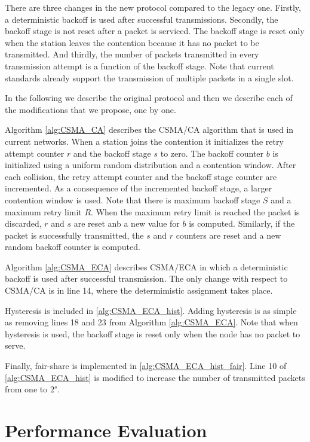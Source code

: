 \documentclass[conference]{IEEEtran}
\begin{document}
There are three changes in the new protocol compared to the legacy one.
Firstly, a deterministic backoff is used after successful transmissions.
Secondly, the backoff stage is not reset after a packet is serviced.
The backoff stage is reset only when the station leaves the contention because it has no packet to be transmitted.
And thirdly, the number of packets transmitted in every transmission attempt is a function of the backoff stage.
Note that current standards already support the transmission of multiple packets in a single slot.

In the following we describe the original protocol and then we describe each of the modifications that we propose, one by one.

Algorithm \ref{alg:CSMA_CA} describes the CSMA/CA algorithm that is used in current networks.
When a station joins the contention it initializes the retry attempt counter $r$ and the backoff stage $s$ to zero.
The backoff counter $b$ is initialized using a uniform random distribution and a contention window.
After each collision, the retry attempt counter and the backoff stage counter are incremented.
As a consequence of the incremented backoff stage, a larger contention window is used.
Note that there is maximum backoff stage $S$ and a maximum retry limit $R$.
When the maximum retry  limit is reached the packet is discarded, $r$ and $s$ are reset anb a new value for $b$ is computed.
Similarly, if the packet is successfully transmitted, the $s$ and $r$ counters are reset and a new random backoff counter is computed.

Algorithm \ref{alg:CSMA_ECA} describes CSMA/ECA in which a deterministic backoff is used after successful transmission.
The only change with respect to CSMA/CA is in line 14, where the determimistic assignment takes place.

Hysteresis is included in \ref{alg:CSMA_ECA_hist}.
Adding hysteresis is as simple as removing lines 18 and 23 from Algorithm \ref{alg:CSMA_ECA}.
Note that when hysteresis is used, the backoff stage is reset only when the node has no packet to serve.

Finally, fair-share is implemented in \ref{alg:CSMA_ECA_hist_fair}.
Line 10 of \ref{alg:CSMA_ECA_hist} is modified to increase the number of transmitted packets from one to $2^s$.

\section{Performance Evaluation} \label{sec:perf_eval}
\end{document}
